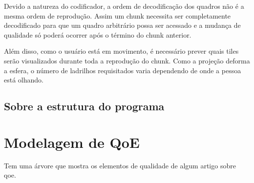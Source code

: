 Devido a natureza do codificador, a ordem de decodificação dos quadros não é a mesma ordem de reprodução. Assim um chunk necessita ser completamente decodificado para que um quadro arbitrário possa ser acessado e a mudança de qualidade só poderá ocorrer após o término do chunk anterior.

Além disso, como o usuário está em movimento, é necessário prever quais tiles serão visualizados durante toda a reprodução do chunk. Como a projeção deforma a esfera, o número de ladrilhos requisitados varia dependendo de onde a pessoa está olhando.


\subsection{Sobre a estrutura do programa}

\section{Modelagem de QoE}

Tem uma árvore que mostra os elementos de qualidade de algum artigo sobre qoe.


